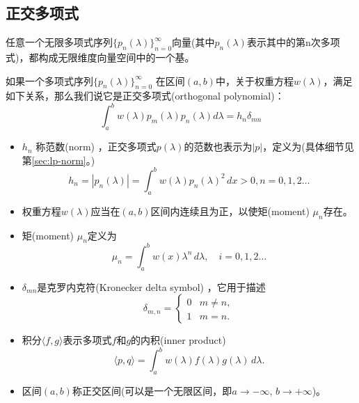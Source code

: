 \begin{subappendices}
\subsection{正交多项式}
任意一个无限多项式序列$\{p_{n}(\lambda)\}_{n=0}^{\infty}$向量(其中$p_{n}(\lambda)$表示其中的第n次多项式)，都构成无限维度向量空间中的一个基。
\begin{definition}[正交多项式]
  如果一个多项式序列$\{p_n(\lambda)\}_{n=0}^{\infty}$ 在区间$(a,b)$中，关于权重方程$w(\lambda)$，满足如下关系，那么我们说它是正交多项式(orthogonal polynomial)：
  \begin{equation}
    \label{eq:poly-orthogonal-poly-def}
    \int_a^b w(\lambda) p_m(\lambda) p_n(\lambda) d \lambda = h_n \delta_{mn}
  \end{equation}
\end{definition}
  \begin{itemize}
    \item $h_n$ 称范数(norm)  ，正交多项式$p(\lambda)$的范数也表示为$\left| p \right|$，定义为(具体细节见第\ref{sec:lp-norm}。)
    \begin{equation}
      \label{eq:poly-norm-def}
      h_n = \left| p_{n}(\lambda) \right| = \int_a^b w(\lambda) p_n(\lambda)^2 \, d x >0, n=0,1,2\ldots
    \end{equation}
    \item 权重方程$w(\lambda)$应当在$(a,b)$区间内连续且为正，以使矩(moment) $\mu_n$存在。
    \item 矩(moment) $\mu_n$定义为
    \begin{equation}
    \label{eq:poly-moment-def}
    \mu_n = \int_a^b w(x) \lambda^n \, d \lambda, \quad i=0,1,2\ldots
  \end{equation}
    \item $\delta_{mn}$是克罗内克符(Kronecker delta symbol) ，它用于描述
    \begin{equation}
      \label{poly-kronecker}
      \delta_{m,n} = \begin{cases}
      0 & m \neq n, \\
      1 & m=n.
      \end{cases}
    \end{equation}
    \item 积分$\langle f, g \rangle$表示多项式$f$和$g$的内积(inner product)
    \begin{equation}
      \label{eq:poly-inner-product-def}
      \langle p,q \rangle =
      \int_a^b w(\lambda) f(\lambda) g(\lambda) \, d \lambda.
    \end{equation}
    \item 区间$(a,b)$称正交区间(可以是一个无限区间，即$a \rightarrow -\infty, \, b \rightarrow +\infty$)。
  \end{itemize}


\end{subappendices}
